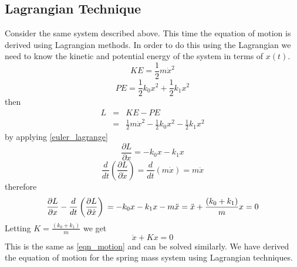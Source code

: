 \subsection{Lagrangian Technique}
Consider the same system described above. This time the equation of motion is
derived using Lagrangian methods. In order to do this using the Lagrangian we
need to know the kinetic and potential energy of the system in terms of $x(t)$.
\begin{equation}
	KE = \frac{1}{2}m\dot{x}^2
\end{equation}
\[
	PE = \frac{1}{2}k_0x^2 + \frac{1}{2}k_1x^2
\]
then 
\begin{eqnarray*}
L&=&KE - PE\\
	&=&\frac{1}{2}m\dot{x}^2 - \frac{1}{2}k_0x^2 - \frac{1}{2}k_1x^2
\end{eqnarray*}
by applying \ref{euler_lagrange}
\begin{equation}
	\frac{\partial L}{\partial x} = -k_0x - k_1x
\end{equation}
\begin{equation}
	\frac{d}{dt}\left(\frac{\partial L}{\partial \dot{x}}\right) = \frac{d}{dt}\left(m\dot{x}\right) = m\ddot{x}
\end{equation}
therefore
\begin{equation}
	\frac{\partial L}{\partial x} - \frac{d}{dt}\left(\frac{\partial L}{\partial \dot{x}}\right)\\
	= -k_0x - k_1x - m\ddot{x}\\
	= \ddot{x} + \frac{(k_{0} + k_{1})}{m}x 
	= 0
\end{equation}
Letting $K = \frac{(k_{0} + k_{1})}{m}$ we get
\begin{equation}
	\ddot{x} + Kx = 0
\end{equation}
This is the same as \ref{eqn_motion} and can be solved similarly. We have
derived the equation of motion for the spring mass system using Lagrangian
techniques.

